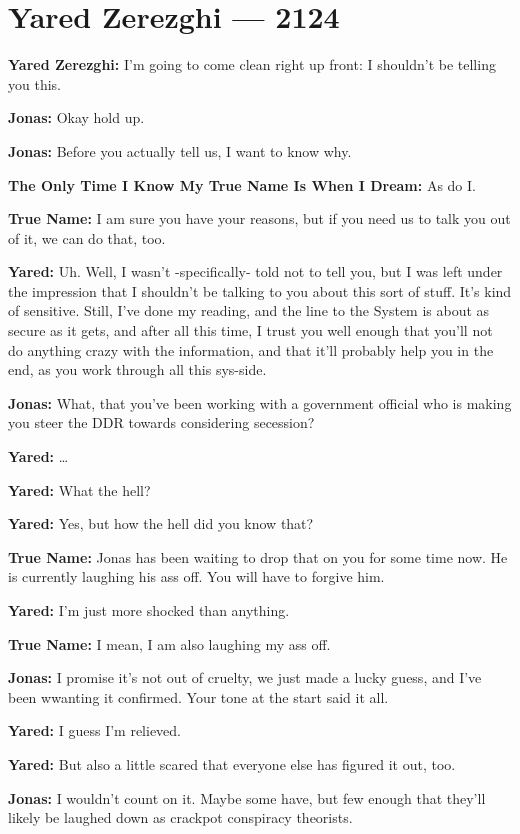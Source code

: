 \hypertarget{yared-zerezghi-2124}{%
\chapter{Yared Zerezghi — 2124}\label{yared-zerezghi-2124}}

\textbf{Yared Zerezghi:} I'm going to come clean right up front: I shouldn't be telling you this.

\textbf{Jonas:} Okay hold up.

\textbf{Jonas:} Before you actually tell us, I want to know why.

\textbf{The Only Time I Know My True Name Is When I Dream:} As do I.

\textbf{True Name:} I am sure you have your reasons, but if you need us to talk you out of it, we can do that, too.

\textbf{Yared:} Uh. Well, I wasn't -specifically- told not to tell you, but I was left under the impression that I shouldn't be talking to you about this sort of stuff. It's kind of sensitive. Still, I've done my reading, and the line to the System is about as secure as it gets, and after all this time, I trust you well enough that you'll not do anything crazy with the information, and that it'll probably help you in the end, as you work through all this sys-side.

\textbf{Jonas:} What, that you've been working with a government official who is making you steer the DDR towards considering secession?

\textbf{Yared:} \ldots{}

\textbf{Yared:} What the hell?

\textbf{Yared:} Yes, but how the hell did you know that?

\textbf{True Name:} Jonas has been waiting to drop that on you for some time now. He is currently laughing his ass off. You will have to forgive him.

\textbf{Yared:} I'm just more shocked than anything.

\textbf{True Name:} I mean, I am also laughing my ass off.

\textbf{Jonas:} I promise it's not out of cruelty, we just made a lucky guess, and I've been wwanting it confirmed. Your tone at the start said it all.

\textbf{Yared:} I guess I'm relieved.

\textbf{Yared:} But also a little scared that everyone else has figured it out, too.

\textbf{Jonas:} I wouldn't count on it. Maybe some have, but few enough that they'll likely be laughed down as crackpot conspiracy theorists.

